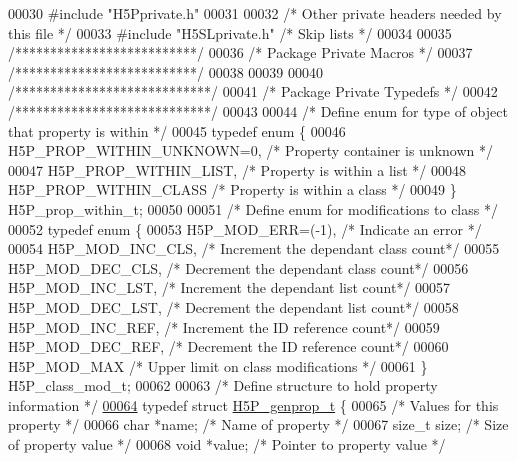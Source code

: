 \begin{DoxyCode}
00030 \textcolor{preprocessor}{#include "H5Pprivate.h"}
00031 
00032 \textcolor{comment}{/* Other private headers needed by this file */}
00033 \textcolor{preprocessor}{#include "H5SLprivate.h"}    \textcolor{comment}{/* Skip lists               */}
00034 
00035 \textcolor{comment}{/**************************/}
00036 \textcolor{comment}{/* Package Private Macros */}
00037 \textcolor{comment}{/**************************/}
00038 
00039 
00040 \textcolor{comment}{/****************************/}
00041 \textcolor{comment}{/* Package Private Typedefs */}
00042 \textcolor{comment}{/****************************/}
00043 
00044 \textcolor{comment}{/* Define enum for type of object that property is within */}
00045 \textcolor{keyword}{typedef} \textcolor{keyword}{enum} \{
00046     H5P\_PROP\_WITHIN\_UNKNOWN=0,  \textcolor{comment}{/* Property container is unknown */}
00047     H5P\_PROP\_WITHIN\_LIST,       \textcolor{comment}{/* Property is within a list */}
00048     H5P\_PROP\_WITHIN\_CLASS       \textcolor{comment}{/* Property is within a class */}
00049 \} H5P\_prop\_within\_t;
00050 
00051 \textcolor{comment}{/* Define enum for modifications to class */}
00052 \textcolor{keyword}{typedef} \textcolor{keyword}{enum} \{
00053     H5P\_MOD\_ERR=(-1),   \textcolor{comment}{/* Indicate an error */}
00054     H5P\_MOD\_INC\_CLS,    \textcolor{comment}{/* Increment the dependant class count*/}
00055     H5P\_MOD\_DEC\_CLS,    \textcolor{comment}{/* Decrement the dependant class count*/}
00056     H5P\_MOD\_INC\_LST,    \textcolor{comment}{/* Increment the dependant list count*/}
00057     H5P\_MOD\_DEC\_LST,    \textcolor{comment}{/* Decrement the dependant list count*/}
00058     H5P\_MOD\_INC\_REF,    \textcolor{comment}{/* Increment the ID reference count*/}
00059     H5P\_MOD\_DEC\_REF,    \textcolor{comment}{/* Decrement the ID reference count*/}
00060     H5P\_MOD\_MAX         \textcolor{comment}{/* Upper limit on class modifications */}
00061 \} H5P\_class\_mod\_t;
00062 
00063 \textcolor{comment}{/* Define structure to hold property information */}
\hyperlink{struct_h5_p__genprop__t}{00064} \textcolor{keyword}{typedef} \textcolor{keyword}{struct }\hyperlink{struct_h5_p__genprop__t}{H5P\_genprop\_t} \{
00065     \textcolor{comment}{/* Values for this property */}
00066     \textcolor{keywordtype}{char} *name;         \textcolor{comment}{/* Name of property */}
00067     \textcolor{keywordtype}{size\_t} size;        \textcolor{comment}{/* Size of property value */}
00068     \textcolor{keywordtype}{void} *value;        \textcolor{comment}{/* Pointer to property value */}

\end{DoxyCode}
